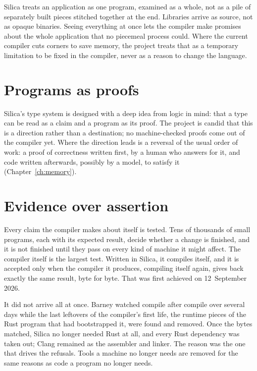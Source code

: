Silica treats an application as one program, examined as a whole, not as a pile
of separately built pieces stitched together at the end. Libraries arrive as
source, not as opaque binaries. Seeing everything at once lets the compiler make
promises about the whole application that no piecemeal process could. Where the
current compiler cuts corners to save memory, the project treats that as a
temporary limitation to be fixed in the compiler, never as a reason to change
the language.


\section{Programs as proofs}

Silica's type system is designed with a deep idea from logic in mind: that a
type can be read as a claim and a program as its proof. The project is candid
that this is a direction rather than a destination; no machine-checked proofs
come out of the compiler yet. Where the direction leads is a reversal of the
usual order of work: a proof of correctness written first, by a human who answers
for it, and code written afterwards, possibly by a model, to satisfy it
(Chapter~\ref{ch:memory}).

\section{Evidence over assertion}

Every claim the compiler makes about itself is tested. Tens of thousands of
small programs, each with its expected result, decide whether a change is
finished, and it is not finished until they pass on every kind of machine it
might affect. The compiler itself is the largest test. Written in Silica, it
compiles itself, and it is accepted only when the compiler it produces, compiling
itself again, gives back exactly the same result, byte for byte. That was first
achieved on 12~September 2026.

It did not arrive all at once. Barney watched compile after compile over several
days while the last leftovers of the compiler's first life, the runtime pieces
of the Rust program that had bootstrapped it, were found and removed. Once the
bytes matched, Silica no longer needed Rust at all, and every Rust dependency
was taken out; Clang remained as the assembler and linker. The reason was the
one that drives the refusals. Tools a machine no longer needs are removed for
the same reasons as code a program no longer needs.


